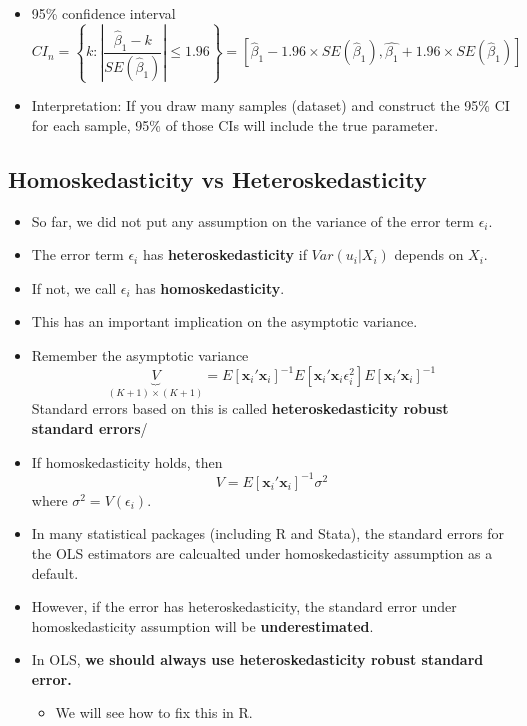 \documentclass[]{book}
\providecommand{\tightlist}{%
  \setlength{\itemsep}{0pt}\setlength{\parskip}{0pt}}
\begin{document}
\begin{itemize}
\tightlist
\item
  95\% confidence interval \[
  CI_{n}  =\left\{ k:|\frac{\hat{\beta}_{1}-k}{SE(\hat{\beta}_{1})}|\leq1.96\right\} 
  =\left[\hat{\beta}_{1}-1.96\times SE(\hat{\beta}_{1}),\hat{\beta_{1}}+1.96\times SE(\hat{\beta}_{1})\right]
  \]
\item
  Interpretation: If you draw many samples (dataset) and construct the
  95\% CI for each sample, 95\% of those CIs will include the true
  parameter.
\end{itemize}

\subsection{Homoskedasticity vs
Heteroskedasticity}\label{homoskedasticity-vs-heteroskedasticity}

\begin{itemize}
\tightlist
\item
  So far, we did not put any assumption on the variance of the error
  term \(\epsilon_i\).
\item
  The error term \(\epsilon_{i}\) has \textbf{heteroskedasticity} if
  \(Var(u_{i}|X_{i})\) depends on \(X_{i}\).
\item
  If not, we call \(\epsilon_{i}\) has \textbf{homoskedasticity}.
\item
  This has an important implication on the asymptotic variance.
\item
  Remember the asymptotic variance \[
  \underbrace{V}_{(K+1)\times(K+1)}
   = E[\mathbf{x}_{i}'\mathbf{x}_{i}]^{-1}E[\mathbf{x}_{i}'\mathbf{x}_{i}\epsilon_{i}^{2}]E[\mathbf{x}_{i}'\mathbf{x}_{i}]^{-1}
  \] Standard errors based on this is called \textbf{heteroskedasticity
  robust standard errors}/
\item
  If homoskedasticity holds, then \[
  V = E[\mathbf{x}_{i}'\mathbf{x}_{i}]^{-1}\sigma^{2}
  \] where \(\sigma^2 = V(\epsilon_i)\).
\item
  In many statistical packages (including R and Stata), the standard
  errors for the OLS estimators are calcualted under homoskedasticity
  assumption as a default.
\item
  However, if the error has heteroskedasticity, the standard error under
  homoskedasticity assumption will be \textbf{underestimated}.
\item
  In OLS, \textbf{we should always use heteroskedasticity robust
  standard error.}

  \begin{itemize}
  \tightlist
  \item
    We will see how to fix this in R.
  \end{itemize}
\end{itemize}
\end{document}
